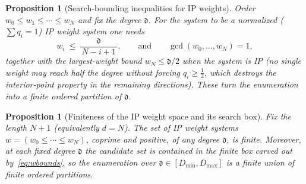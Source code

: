 \documentclass{amsart}
\newtheorem{proposition}[theorem]{Proposition}
\begin{document}
\begin{proposition}[Search-bounding inequalities for IP weights]
\label{prop:wbounds}
Order $w_0 \le w_1 \le \cdots \le w_N$ and fix the degree $\mathfrak{d}$.
For the system to be a normalized ($\sum q_i =1$) IP weight system one needs
\begin{equation}\label{eq:wbounds}
  w_i \ \le\ \frac{\mathfrak{d}}{\,N - i + 1\,},
  \qquad\text{and}\qquad
  \gcd(w_0,\dots,w_N) = 1 ,
\end{equation}
together with the largest-weight bound $w_N \le \mathfrak{d}/2$ when the
system is IP (no single weight may reach half the degree without forcing
$q_i \ge \tfrac12$, which destroys the interior-point property in the
remaining directions). These turn the enumeration into a finite
\emph{ordered partition} of $\mathfrak{d}$.
\end{proposition}

\begin{proposition}[Finiteness of the IP weight space and its search box]
\label{prop:wsfinite}
Fix the length $N{+}1$ (equivalently $d=N$). The set of IP weight systems
$w=(w_0\le\cdots\le w_N)$, coprime and positive, of \emph{any} degree
$\mathfrak d$, is \emph{finite}. Moreover, at each \emph{fixed} degree
$\mathfrak d$ the candidate set is contained in the finite box carved out
by~\eqref{eq:wbounds}, so the enumeration over $\mathfrak d \in
[D_{\min},D_{\max}]$ is a finite union of finite ordered partitions.
\end{proposition}
\end{document}
